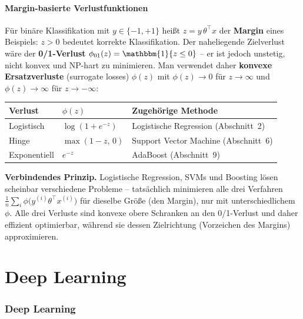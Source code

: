 \documentclass[11pt]{article}
\theoremstyle{csthm}
\theoremstyle{csdef}
\newcommand{\I}{\mathbbm{1}}
\newcommand{\T}{^\top}
\begin{document}
\subsection{Margin-basierte Verlustfunktionen}

Für binäre Klassifikation mit $y \in \{-1,+1\}$ heißt $z = y\,\theta\T x$ der
\textbf{Margin} eines Beispiels: $z>0$ bedeutet korrekte Klassifikation. Der
naheliegende Zielverlust wäre der \textbf{0/1-Verlust}
$\phi_{01}(z) = \I\{z\leq 0\}$ -- er ist jedoch unstetig, nicht konvex und
NP-hart zu minimieren. Man verwendet daher \textbf{konvexe Ersatzverluste}
(surrogate losses) $\phi(z)$ mit $\phi(z)\to 0$ für $z\to\infty$ und
$\phi(z)\to\infty$ für $z\to -\infty$:

\begin{center}
\begin{tabular}{lll}
\toprule
Verlust & $\phi(z)$ & Zugehörige Methode \\
\midrule
Logistisch & $\log(1+e^{-z})$ & Logistische Regression (Abschnitt~2) \\
Hinge & $\max(1-z,\,0)$ & Support Vector Machine (Abschnitt~6) \\
Exponentiell & $e^{-z}$ & AdaBoost (Abschnitt~9) \\
\bottomrule
\end{tabular}
\end{center}

\begin{tcolorbox}[thmstyle]
\textbf{Verbindendes Prinzip.} Logistische Regression, SVMs und Boosting
lösen scheinbar verschiedene Probleme -- tatsächlich minimieren alle drei
Verfahren $\frac{1}{n}\sum_i \phi\bigl(y^{(i)}\theta\T x^{(i)}\bigr)$ für
dieselbe Größe (den Margin), nur mit unterschiedlichem $\phi$. Alle drei
Verluste sind konvexe obere Schranken an den 0/1-Verlust und daher effizient
optimierbar, während sie dessen Zielrichtung (Vorzeichen des Margins)
approximieren.
\end{tcolorbox}

\newpage
\part{Deep Learning}

\section{Deep Learning}
\end{document}
